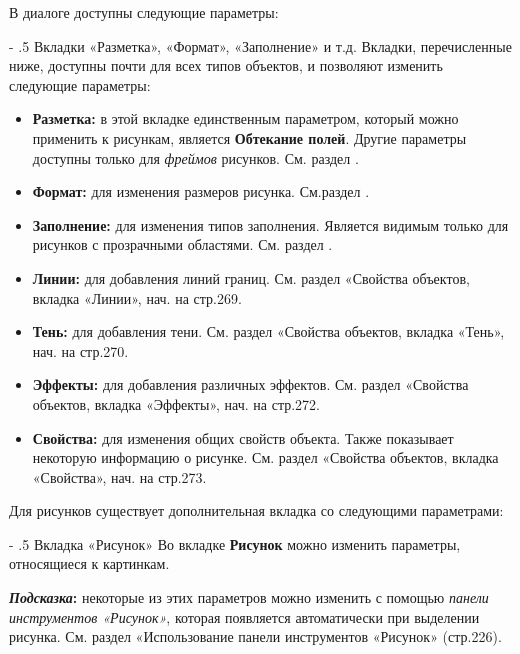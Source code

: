 ﻿\documentclass[a4paper,10pt]{article}
\makeatletter
\renewcommand\paragraph{%
   \@startsection{paragraph}{4}{0mm}%
      {-\baselineskip}%
      {.5\baselineskip}%
      {\normalfont\normalsize\bfseries}}
\makeatother
\begin{document}
В диалоге доступны следующие параметры:

\paragraph{Вкладки «Разметка», «Формат», «Заполнение» и т.д.}
Вкладки, перечисленные ниже, доступны почти для всех типов объектов, и позволяют изменить следующие параметры:

\begin{itemize}
 \item \textbf{Разметка:} в этой вкладке единственным параметром, который можно применить к рисункам, является \textbf{Обтекание полей}. Другие параметры доступны только для \textit{фреймов} рисунков. См. раздел .
 \item \textbf{Формат:} для изменения размеров рисунка. См.раздел .
 \item \textbf{Заполнение:} для изменения типов заполнения. Является видимым только для рисунков с прозрачными областями. См. раздел .
 \item \textbf{Линии:} для добавления линий границ. См. раздел «Свойства объектов, вкладка «Линии», нач. на стр.269.
 \item \textbf{Тень:} для добавления тени. См. раздел «Свойства объектов, вкладка «Тень», нач. на стр.270.
 \item \textbf{Эффекты:} для добавления  различных эффектов. См. раздел «Свойства объектов, вкладка «Эффекты», нач. на стр.272.
 \item \textbf{Свойства:} для изменения общих свойств объекта. Также показывает некоторую информацию о рисунке. См. раздел «Свойства объектов, вкладка «Свойства», нач. на стр.273.
\end{itemize}

Для рисунков существует дополнительная вкладка со следующими параметрами:

\paragraph{Вкладка «Рисунок»}
Во вкладке \textbf{Рисунок} можно изменить параметры, относящиеся к картинкам.

\begin{mdframed}[backgroundcolor=blue!10]
\textbf{\textit{Подсказка}:} некоторые из этих параметров можно изменить с помощью \textit{панели инструментов «Рисунок»}, которая появляется автоматически при выделении рисунка. См. раздел  «Использование панели инструментов «Рисунок» (стр.226).
\end{mdframed}
\end{document}
